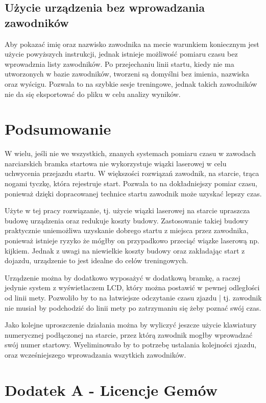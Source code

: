 \documentclass[11pt,a4paper, twoside]{article}
\begin{document}
\subsection{Użycie urządzenia bez wprowadzania zawodników}
Aby pokazać imię oraz nazwisko zawodnika na mecie warunkiem koniecznym jest użycie powyższych instrukcji, jednak istnieje możliwość pomiaru czasu bez wprowadznia listy zawodników. Po przejechaniu linii startu, kiedy nie ma utworzonych w bazie zawodników, tworzeni są domyślni bez imienia, nazwiska oraz wyścigu. Pozwala to na szybkie sesje treningowe, jednak takich zawodników nie da się eksportować do pliku w celu analizy wyników.
\newpage
\section{Podsumowanie}
W wielu, jeśli nie we wszystkich, znanych systemach pomiaru czasu w zawodach narciarskich bramka startowa nie wykorzystuje wiązki laserowej w celu uchwycenia przejazdu startu. W większości rozwiązań zawodnik, na starcie, trąca nogami tyczkę, która rejestruje start. Pozwala to na dokładniejszy pomiar czasu, ponieważ dzięki dopracowanej technice startu zawodnik może uzyskać lepszy czas.

Użyte w tej pracy rozwiązanie, tj. użycie wiązki laserowej na starcie upraszcza budowę urządzenia oraz redukuje koszty budowy. Zastosowanie takiej budowy praktycznie uniemożliwa uzyskanie dobrego startu z miejsca przez zawodnika, ponieważ istnieje ryzyko że mógłby on przypadkowo przeciąć wiązke laserową np. kijkiem. Jednak z uwagi na niewielkie koszty budowy oraz zakładając start z dojazdu, urządzenie to jest idealne do celów treningowych.

Urządzenie można by dodatkowo wyposażyć w dodatkową bramkę, a raczej jedynie system z wyświetlaczem LCD, który można postawić w pewnej odległości od linii mety. Pozwoliło by to na łatwiejsze odczytanie czasu zjazdu | tj. zawodnik nie musiał by podchodzić do linii mety po zatrzymaniu się żeby poznać swój czas.

Jako kolejne uproszczenie działania można by wyliczyć jeszcze użycie klawiatury numerycznej podłączonej na starcie, przez którą zawodnik mogłby wprowadzać swój numer startowy. Wyeliminowało by to potrzebę ustalania kolejności zjazdu, oraz wcześniejszego wprowadzania wszytkich zawodników.
\newpage
\section{Dodatek A - Licencje Gemów}
\end{document}
